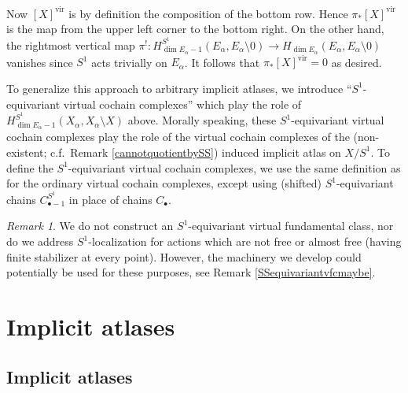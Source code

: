 \documentclass[12pt]{article}
\theoremstyle{definition}
\theoremstyle{remark}
\newtheorem{remark}[theorem]{Remark}
\numberwithin{equation}{subsection}
\newcommand{\vir}{\mathrm{vir}}
\begin{document}
Now $[X]^\vir$ is by definition the composition of the bottom row.  Hence $\pi_\ast[X]^\vir$ is the map from the upper left corner to the bottom right.  On the other hand, the rightmost vertical map $\pi^!:H_{\dim E_\alpha-1}^{S^1}(E_\alpha,E_\alpha\setminus 0)\to H_{\dim E_\alpha}(E_\alpha,E_\alpha\setminus 0)$ vanishes since $S^1$ acts trivially on $E_\alpha$.  It follows that $\pi_\ast[X]^\vir=0$ as desired.

To generalize this approach to arbitrary implicit atlases, we introduce ``$S^1$-equivariant virtual cochain complexes'' which play the role of $H_{\dim E_\alpha-1}^{S^1}(X_\alpha,X_\alpha\setminus X)$ above.  Morally speaking, these $S^1$-equivariant virtual cochain complexes play the role of the virtual cochain complexes of the (non-existent; c.f.\ Remark \ref{cannotquotientbySS}) induced implicit atlas on $X/S^1$.  To define the $S^1$-equivariant virtual cochain complexes, we use the same definition as for the ordinary virtual cochain complexes, except using (shifted) $S^1$-equivariant chains $C_{\bullet-1}^{S^1}$ in place of chains $C_\bullet$.

\begin{remark}
We do not construct an $S^1$-equivariant virtual fundamental class, nor do we address $S^1$-localization for actions which are not free or almost free (having finite stabilizer at every point).  However, the machinery we develop could potentially be used for these purposes, see Remark \ref{SSequivariantvfcmaybe}.
\end{remark}

\section{Implicit atlases}\label{implicitatlasdefsec}

\subsection{Implicit atlases}
\end{document}

